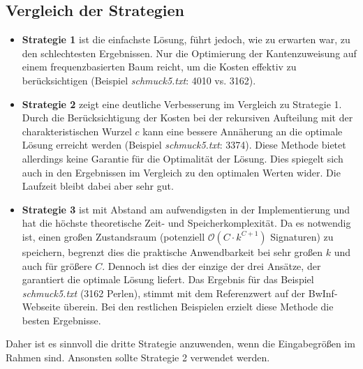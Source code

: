 \documentclass[a4paper,10pt,ngerman]{scrartcl}
\begin{document}
\subsection{Vergleich der Strategien}
\begin{itemize}
  \item \textbf{Strategie 1} ist die einfachste Lösung, führt jedoch, wie zu erwarten war, zu den schlechtesten Ergebnissen. Nur die Optimierung der Kantenzuweisung auf einem frequenzbasierten Baum reicht, um die Kosten effektiv zu berücksichtigen (Beispiel \textit{schmuck5.txt}: 4010 vs. 3162).
  \item \textbf{Strategie 2} zeigt eine deutliche Verbesserung im Vergleich zu Strategie 1. Durch die Berücksichtigung der Kosten bei der rekursiven Aufteilung mit der charakteristischen Wurzel $c$ kann eine bessere Annäherung an die optimale Lösung erreicht werden (Beispiel \textit{schmuck5.txt}: 3374). Diese Methode bietet allerdings keine Garantie für die Optimalität der Lösung. Dies spiegelt sich auch in den Ergebnissen im Vergleich zu den optimalen Werten wider. Die Laufzeit bleibt dabei aber sehr gut.
  \item \textbf{Strategie 3} ist mit Abstand am aufwendigsten in der Implementierung und hat die höchste theoretische Zeit- und Speicherkomplexität. Da es notwendig ist, einen großen Zustandsraum (potenziell $\mathcal{O}(C\cdot k^{C+1})$ Signaturen) zu speichern, begrenzt dies die praktische Anwendbarkeit bei sehr großen $k$ und auch für größere $C$. Dennoch ist dies der einzige der drei Ansätze, der garantiert die optimale Lösung liefert. Das Ergebnis für das Beispiel \textit{schmuck5.txt} (3162 Perlen), stimmt mit dem Referenzwert auf der BwInf-Webseite überein. Bei den restlichen Beispielen erzielt diese Methode die besten Ergebnisse.
\end{itemize}
Daher ist es sinnvoll die dritte Strategie anzuwenden, wenn die Eingabegrößen im Rahmen sind. Ansonsten sollte Strategie 2 verwendet werden.
\end{document}
